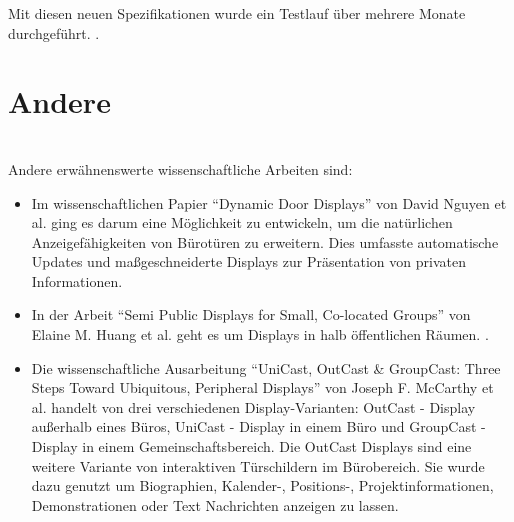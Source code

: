 Mit diesen neuen Spezifikationen wurde ein Testlauf über mehrere Monate durchgeführt. \cite{wood:2014}. \cite{wood:2014}


\section{Andere}
\\
Andere erwähnenswerte wissenschaftliche Arbeiten sind:
\begin{itemize}
  \item Im wissenschaftlichen Papier ``Dynamic Door Displays'' von David Nguyen et al. ging es darum eine Möglichkeit zu entwickeln, um die natürlichen Anzeigefähigkeiten von Bürotüren zu erweitern. Dies umfasste automatische Updates und maßgeschneiderte Displays zur Präsentation von privaten Informationen\cite{nguyen:dyn-door-disp}.
  \item In der Arbeit ``Semi Public Displays for Small, Co-located Groups'' von Elaine M. Huang et al. geht es um Displays in halb öffentlichen Räumen. \cite{huang:2003}.
  \item Die wissenschaftliche Ausarbeitung ``UniCast, OutCast \& GroupCast: Three Steps Toward Ubiquitous, Peripheral Displays'' von Joseph F. McCarthy et al. handelt von drei verschiedenen Display-Varianten: OutCast - Display außerhalb eines Büros, UniCast - Display in einem Büro und GroupCast - Display in einem Gemeinschaftsbereich\cite{mccarthy:2001}. Die OutCast Displays sind eine weitere Variante von interaktiven Türschildern im Bürobereich. Sie wurde dazu genutzt um Biographien, Kalender-, Positions-, Projektinformationen, Demonstrationen oder Text Nachrichten anzeigen zu lassen.
\end{itemize}